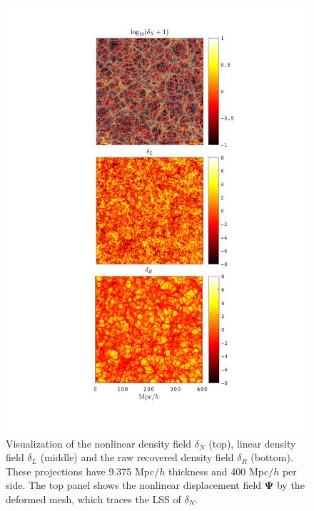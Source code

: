 \documentclass[aps,prd,twocolumn,superscriptaddress,amsfont,amssymb,amsmath,nofootinbib,showpacs,balancelastpage]{revtex4-1}
\newcommand{\bs}{\boldsymbol}
\begin{document}

\maketitle
\begin{figure}
 \centering
  \includegraphics[width=0.95\linewidth]{proj.pdf}
  \caption{Visualization of the nonlinear density field $\delta_N$ (top),
  linear density field $\delta_L$ (middle) and the raw recovered density
  field $\delta_R$ (bottom). These projections have 9.375 Mpc$/h$ thickness
  and 400 Mpc$/h$ per side. The top panel shows the nonlinear displacement
  field $\bs\Psi$ by the deformed mesh, which traces the LSS of $\delta_N$.}
  \label{fig.projection}
\end{figure}
\end{document}
